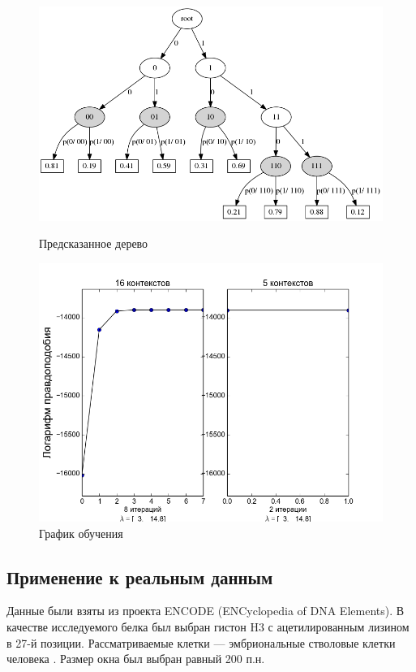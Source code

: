 \documentclass{matmex-diploma-custom}
\begin{document}
\begin{figure}[h!]
\begin{minipage}[b]{0.49 \textwidth}
\end{minipage}
\hfil \hfil%
\begin{minipage}[b]{0.49 \textwidth}
	\includegraphics[scale=0.3]{img/sample/predicted_trie.png}
	\centering
	\caption{ Предсказанное дерево }
	\label{ris:sample_vlhmm_predicted_trie}
\end{minipage}
\begin{minipage}[b]{0.8 \textwidth}
	\includegraphics[scale=0.4]{img/sample/plot_.png}
	\centering
	\caption{ График обучения }
	\label{ris:sample_vlhmm_log_likelihood}
\end{minipage}
\end{figure}

\subsection{Применение к реальным данным}
Данные были взяты из проекта ENCODE (ENCyclopedia of DNA Elements).
В качестве исследуемого белка был выбран гистон H3 с ацетилированным лизином в 27-й позиции. Рассматриваемые клетки --- эмбриональные стволовые клетки человека \cite{ENCODE}.
Размер окна был выбран равный 200 п.н.
\end{document}
